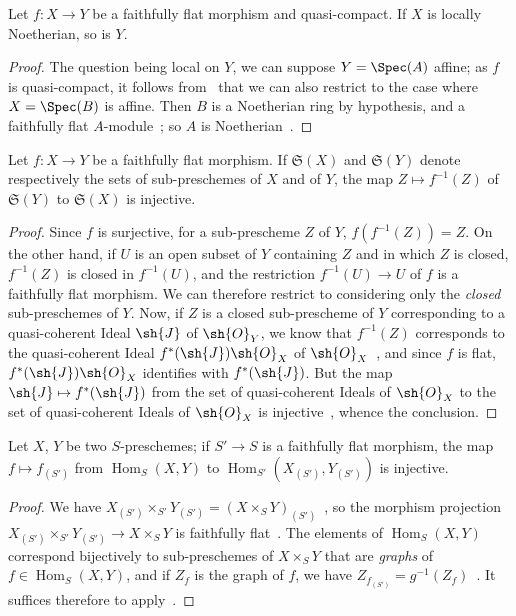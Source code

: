 \begin{proposition}[2.2.14]
\label{IV.2.2.14}
Let $f:X\to Y$ be a faithfully flat morphism and quasi-compact.
If $X$ is locally Noetherian, so is $Y$.
\end{proposition}

\begin{proof}
The question being local on $Y$, we can suppose $Y=\Spec(A)$ affine; as $f$ is quasi-compact, it follows from~ that we can also restrict to the case where $X=\Spec(B)$ is affine.
Then $B$ is a Noetherian ring by hypothesis, and a faithfully flat $A$-module~; so $A$ is Noetherian~.
\end{proof}

\begin{proposition}[2.2.15]
\label{IV.2.2.15}
Let $f:X\to Y$ be a faithfully flat morphism.
If $\mathfrak{S}(X)$ and $\mathfrak{S}(Y)$ denote respectively the sets of sub-preschemes of $X$ and of $Y$, the map $Z\mapsto f^{-1}(Z)$ of $\mathfrak{S}(Y)$ to $\mathfrak{S}(X)$ is injective.
\end{proposition}

\begin{proof}
Since $f$ is surjective, for a sub-prescheme $Z$ of $Y$, $f(f^{-1}(Z))=Z$.
On the other hand, if $U$ is an open subset of $Y$ containing $Z$ and in which $Z$ is closed, $f^{-1}(Z)$ is closed in $f^{-1}(U)$, and the restriction $f^{-1}(U)\to U$ of $f$ is a faithfully flat morphism.
We can therefore restrict to considering only the \emph{closed} sub-preschemes of $Y$.
Now, if $Z$ is a closed sub-prescheme of $Y$ corresponding to a quasi-coherent Ideal $\sh{J}$ of $\sh{O}_Y$, we know that $f^{-1}(Z)$ corresponds to the quasi-coherent Ideal $f^*(\sh{J})\sh{O}_X$ of $\sh{O}_X$~, and since $f$ is flat, $f^*(\sh{J})\sh{O}_X$ identifies with $f^*(\sh{J})$.
But the map $\sh{J}\mapsto f^*(\sh{J})$ from the set of quasi-coherent Ideals of $\sh{O}_X$ to the set of quasi-coherent Ideals of $\sh{O}_X$ is injective~, whence the conclusion.
\end{proof}

\begin{corollary}[2.2.16]
\label{IV.2.2.16}
Let $X$, $Y$ be two $S$-preschemes; if $S'\to S$ is a faithfully flat morphism, the map $f\mapsto f_{(S')}$ from $\operatorname{Hom}_S(X,Y)$ to $\operatorname{Hom}_{S'}(X_{(S')},Y_{(S')})$ is injective.
\end{corollary}

\begin{proof}
We have $X_{(S')}\times_{S'}Y_{(S')}=(X\times_S Y)_{(S')}$~, so the morphism projection $X_{(S')}\times_{S'}Y_{(S')}\to X\times_S Y$ is faithfully flat~.
The elements of $\operatorname{Hom}_S(X,Y)$ correspond bijectively to sub-preschemes of $X\times_S Y$ that are \emph{graphs} of $f\in\operatorname{Hom}_S(X,Y)$, and if $Z_f$ is the graph of $f$, we have $Z_{f_{(S')}}=g^{-1}(Z_f)$~.
It suffices therefore to apply~.
\end{proof}

